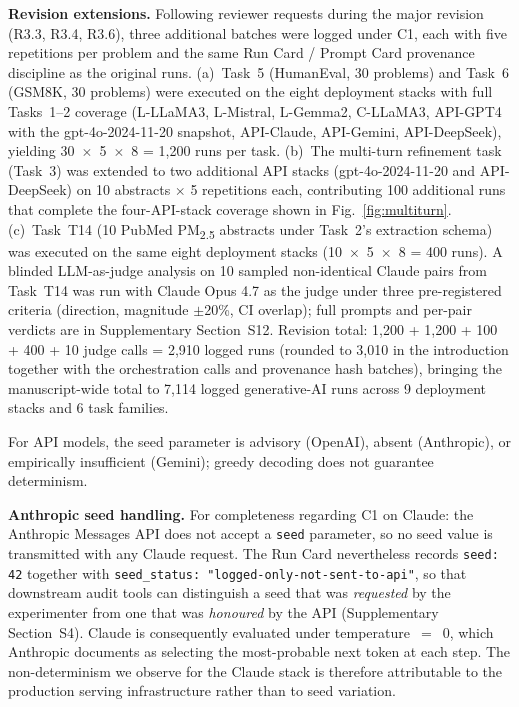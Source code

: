 \documentclass[sn-nature]{sn-jnl}
\begin{document}
\textbf{Revision extensions.} Following reviewer requests during the major revision (R3.3, R3.4, R3.6), three additional batches were logged under C1, each with five repetitions per problem and the same Run Card / Prompt Card provenance discipline as the original runs.
(a)~Task~5 (HumanEval, 30 problems) and Task~6 (GSM8K, 30 problems) were executed on the eight deployment stacks with full Tasks~1--2 coverage (L-LLaMA3, L-Mistral, L-Gemma2, C-LLaMA3, API-GPT4 with the gpt-4o-2024-11-20 snapshot, API-Claude, API-Gemini, API-DeepSeek), yielding 30~$\times$~5~$\times$~8 = 1{,}200 runs per task.
(b)~The multi-turn refinement task (Task~3) was extended to two additional API stacks (gpt-4o-2024-11-20 and API-DeepSeek) on 10 abstracts $\times$ 5 repetitions each, contributing 100 additional runs that complete the four-API-stack coverage shown in Fig.~\ref{fig:multiturn}.
(c)~Task~T14 (10 PubMed PM\textsubscript{2.5} abstracts under Task~2's extraction schema) was executed on the same eight deployment stacks (10~$\times$~5~$\times$~8 = 400 runs).
A blinded LLM-as-judge analysis on 10 sampled non-identical Claude pairs from Task~T14 was run with Claude Opus 4.7 as the judge under three pre-registered criteria (direction, magnitude $\pm$20\%, CI overlap); full prompts and per-pair verdicts are in Supplementary Section~S12.
Revision total: 1{,}200 + 1{,}200 + 100 + 400 + 10 judge calls = 2{,}910 logged runs (rounded to 3{,}010 in the introduction together with the orchestration calls and provenance hash batches), bringing the manuscript-wide total to 7{,}114 logged generative-AI runs across 9 deployment stacks and 6 task families.

For API models, the seed parameter is advisory (OpenAI\cite{openai2024seed}), absent (Anthropic), or empirically insufficient (Gemini); greedy decoding does not guarantee determinism\cite{ouyang2024nondeterminism}.

\textbf{Anthropic seed handling.}
For completeness regarding C1 on Claude: the Anthropic Messages API does not accept a \texttt{seed} parameter, so no seed value is transmitted with any Claude request.
The Run Card nevertheless records \texttt{seed: 42} together with \texttt{seed\_status: "logged-only-not-sent-to-api"}, so that downstream audit tools can distinguish a seed that was \emph{requested} by the experimenter from one that was \emph{honoured} by the API (Supplementary Section~S4).
Claude is consequently evaluated under temperature~$=$~0, which Anthropic documents as selecting the most-probable next token at each step.
The non-determinism we observe for the Claude stack is therefore attributable to the production serving infrastructure rather than to seed variation.
\end{document}
